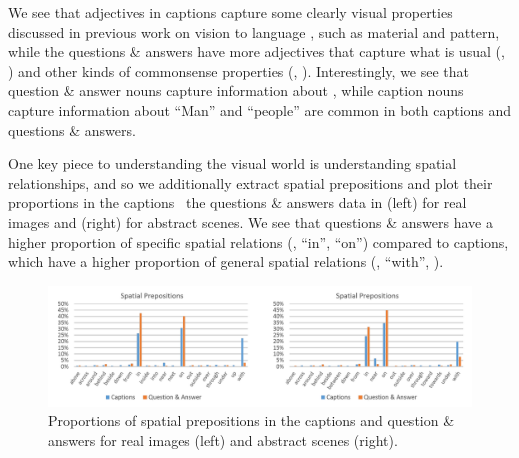 We see that adjectives in captions capture some clearly visual properties discussed in previous work on vision to language \cite{MitchellEtAl13}, such as material and pattern, while the questions \& answers have more adjectives that capture what is usual (\eg, ) and other kinds of commonsense properties (\eg, ).  Interestingly, we see that question \& answer nouns capture information about , while caption nouns capture information about  ``Man'' and ``people'' are common in both captions and questions \& answers.

One key piece to understanding the visual world is understanding spatial relationships, and so we additionally extract spatial prepositions and plot their proportions in the captions \vs~the questions \& answers data in  (left) for real images and  (right) for abstract scenes.  We see that questions \& answers have a higher proportion of specific spatial relations (\ie, ``in'', ``on'') compared to captions, which have a higher proportion of general spatial relations (\ie, ``with'', ).

\begin{figure}
\centering
\includegraphics[width=\linewidth]{figures/spatial_prepositions.pdf}
\caption{Proportions of spatial prepositions in the captions and question \& answers for real images (left) and abstract scenes (right).}
\label{fig:spatial_prepositions}
\end{figure}


